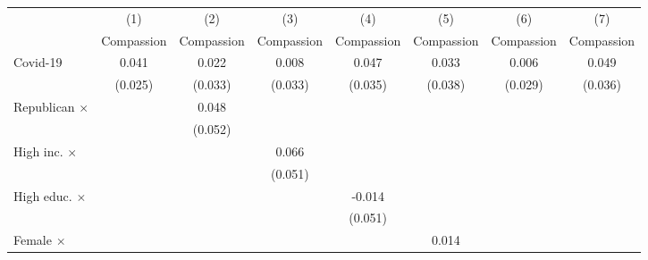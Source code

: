 {
\def\sym#1{\ifmmode^{#1}\else\(^{#1}\)\fi}
\begin{tabular}{l*{7}{c}}
\toprule
                    &\multicolumn{1}{c}{(1)}&\multicolumn{1}{c}{(2)}&\multicolumn{1}{c}{(3)}&\multicolumn{1}{c}{(4)}&\multicolumn{1}{c}{(5)}&\multicolumn{1}{c}{(6)}&\multicolumn{1}{c}{(7)}\\
                    &\multicolumn{1}{c}{Compassion}&\multicolumn{1}{c}{Compassion}&\multicolumn{1}{c}{Compassion}&\multicolumn{1}{c}{Compassion}&\multicolumn{1}{c}{Compassion}&\multicolumn{1}{c}{Compassion}&\multicolumn{1}{c}{Compassion}\\
\midrule
Covid-19            &       0.041         &       0.022         &       0.008         &       0.047         &       0.033         &       0.006         &       0.049         \\
                    &     (0.025)         &     (0.033)         &     (0.033)         &     (0.035)         &     (0.038)         &     (0.029)         &     (0.036)         \\
\addlinespace
Republican $\times$ &                     &       0.048         &                     &                     &                     &                     &                     \\
                    &                     &     (0.052)         &                     &                     &                     &                     &                     \\
\addlinespace
High inc. $\times$  &                     &                     &       0.066         &                     &                     &                     &                     \\
                    &                     &                     &     (0.051)         &                     &                     &                     &                     \\
\addlinespace
High educ. $\times$ &                     &                     &                     &      -0.014         &                     &                     &                     \\
                    &                     &                     &                     &     (0.051)         &                     &                     &                     \\
\addlinespace
Female $\times$     &                     &                     &                     &                     &       0.014         &                     &                     \\

\end{tabular}}
